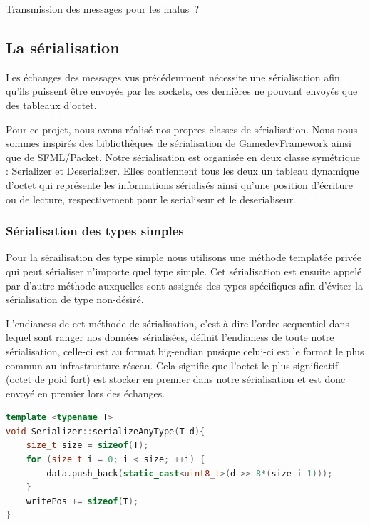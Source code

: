 \documentclass[a4paper, 12pt]{article}
\begin{document}
			Transmission des messages pour les malus ?






	\subsection{La sérialisation}

		Les échanges des messages vus précédemment nécessite une sérialisation afin qu'ils puissent être envoyés par les sockets, ces dernières ne pouvant envoyés que des tableaux d'octet.


		Pour ce projet, nous avons réalisé nos propres classes de sérialisation. Nous nous sommes inspirés des bibliothèques de sérialisation de GamedevFramework ainsi que de SFML/Packet. 
		Notre sérialisation est organisée en deux classe symétrique : Serializer et Deserializer. Elles contiennent tous les deux un tableau dynamique d'octet qui représente les informations sérialisés ainsi qu'une position d'écriture ou de lecture, respectivement pour le serialiseur et le deserialiseur. 
		
		\subsubsection{Sérialisation des types simples}

		Pour la sérailisation des type simple nous utilisons une méthode templatée privée qui peut sérialiser n'importe quel type simple. Cet sérialisation est ensuite appelé par d'autre méthode auxquelles sont assignés des types spécifiques afin d'éviter la sérialisation de type non-désiré.

		
		L'endianess de cet méthode de sérialisation, c'est-à-dire l'ordre sequentiel dans lequel sont ranger nos données sérialisées, définit l'endianess de toute notre sérialisation, celle-ci est au format big-endian pusique celui-ci est le format le plus commun au infrastructure réseau. Cela signifie que l'octet le plus significatif (octet de poid fort) est stocker en premier dans notre sérialisation et est donc envoyé en premier lors des échanges.

\begin{lstlisting}[language=C++, caption=Méthode de sérailisation de type simple\, data est notre tableau dynamique\, d la varaible de type T à sérailiser et writePos la position d'écriture du sérialiseur]
template <typename T>
void Serializer::serializeAnyType(T d){
	size_t size = sizeof(T);
	for (size_t i = 0; i < size; ++i) {
		data.push_back(static_cast<uint8_t>(d >> 8*(size-i-1))); 
	}
	writePos += sizeof(T);
}\end{lstlisting}
\end{document}
